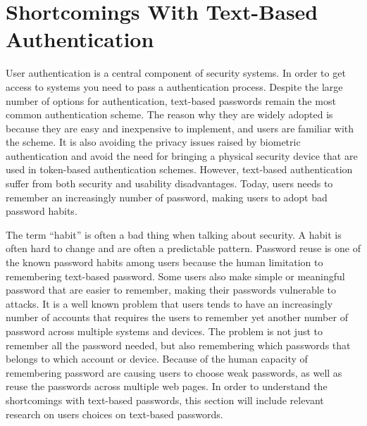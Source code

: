 \section{Shortcomings With Text-Based Authentication} 

  User authentication is a central component of security systems. In order to get access to systems you need to pass a authentication process. Despite the large number of options for authentication, text-based passwords remain the most common authentication scheme. The reason why they are widely adopted is because they are easy and inexpensive to implement, and users are familiar with the scheme. It is also avoiding the privacy issues raised by biometric authentication and avoid the need for bringing a physical security device that are used in token-based authentication schemes. However, text-based authentication suffer from both security and usability disadvantages. Today, users needs to remember an increasingly number of password, making users to adopt bad password habits. 

  The term ``habit'' is often a bad thing when talking about security. A habit is often hard to change and are often a predictable pattern. Password reuse is one of the known password habits among users because the human limitation to remembering text-based password. Some users also make simple or meaningful password that are easier to remember, making their passwords vulnerable to attacks. It is a well known problem that users tends to have an increasingly number of accounts that requires the users to remember yet another number of password across multiple systems and devices. The problem is not just to remember all the password needed, but also remembering which passwords that belongs to which account or device. Because of the human capacity of remembering password are causing users to choose weak passwords, as well as reuse the passwords across multiple web pages. In order to understand the shortcomings with text-based passwords, this section will include relevant research on users choices on text-based passwords.  

